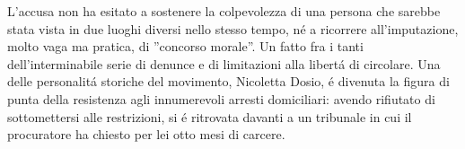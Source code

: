 L’accusa non ha esitato a sostenere la colpevolezza di una persona che sarebbe stata vista in due luoghi diversi nello stesso tempo, n\'e a ricorrere all’imputazione, molto vaga ma pratica, di ''concorso morale''. Un fatto fra i tanti dell’interminabile serie di denunce e di limitazioni alla libert\'a di circolare. Una delle personalit\'a storiche del movimento, Nicoletta Dosio, \'e divenuta la figura di punta della resistenza agli innumerevoli arresti domiciliari: avendo rifiutato di sottomettersi alle restrizioni, si \'e ritrovata davanti a un tribunale in cui il procuratore ha chiesto per lei otto mesi di carcere.